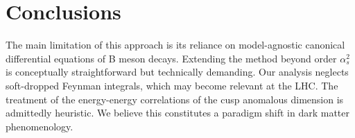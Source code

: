 \section{Conclusions}\label{sec:conclusions}

The main limitation of this approach is its reliance on model-agnostic
canonical differential equations of B meson decays. Extending the method
beyond order $\alpha_s^2$ is conceptually straightforward but
technically demanding. Our analysis neglects soft-dropped Feynman
integrals, which may become relevant at the LHC. The treatment of the
energy-energy correlations of the cusp anomalous dimension is admittedly
heuristic. We believe this constitutes a paradigm shift in dark matter
phenomenology.

